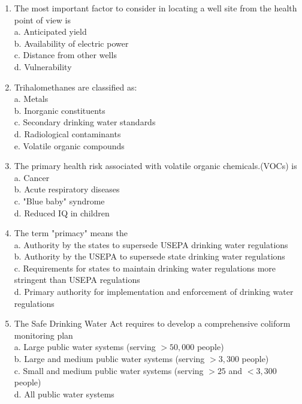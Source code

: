 \documentclass[10pt]{article}
\begin{document}
\begin{enumerate}
\item The most important factor to consider in locating a well site from the health point of view is\\
a. Anticipated yield\\
b. Availability of electric power\\
c. Distance from other wells\\
d. Vulnerability\\

\item Trihalomethanes are classified as:\\
a. Metals\\
b. Inorganic constituents\\
c. Secondary drinking water standards\\
d. Radiological contaminants\\
e. Volatile organic compounds\\


  \item The primary health risk associated with volatile organic chemicals.(VOCs) is\\

a. Cancer\\

b. Acute respiratory diseases\\

c. "Blue baby" syndrome\\

d. Reduced IQ in children\\

\item The term "primacy" means the\\

a. Authority by the states to supersede USEPA drinking water regulations\\

b. Authority by the USEPA to supersede state drinking water regulations\\

c. Requirements for states to maintain drinking water regulations more stringent than USEPA regulations \\
d. Primary authority for implementation and enforcement of drinking water regulations


\item The Safe Drinking Water Act requires to develop a comprehensive coliform monitoring plan\\
a. Large public water systems (serving $>50,000$ people)\\
b. Large and medium public water systems (serving $>3,300$ people)\\
c. Small and medium public water systems (serving $>25$ and $<3,300$ people)\\
d. All public water systems\\


\end{enumerate}
\end{document}
